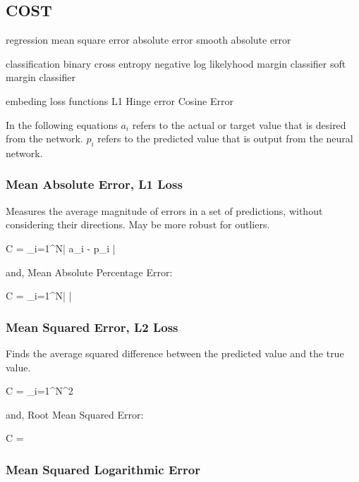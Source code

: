\documentclass{article}
\newcommand{\GPM}[1]{\left| {#1} \right|}
\newcommand{\SUMNP}[3]{\displaystyle\sum_{#1}^{#2}\GPP{#3}}
\newcommand{\SUMNM}[3]{\displaystyle\sum_{#1}^{#2}\GPM{#3}}
\begin{document}
\subsection{COST}

regression
mean square error
absolute error
smooth absolute error

classification
binary cross entropy
negative log likelyhood
margin classifier
soft margin classifier

embeding loss functions
L1 Hinge error
Cosine Error


In the following equations
$a_i$ refers to the actual or target value that is desired from the network.
$p_i$ refers to the predicted value that is output from the neural network.

\subsubsection{Mean Absolute Error, L1 Loss}
Measures the average magnitude of errors in a set of predictions, without considering their directions. May be more robust for outliers.

\begin{tcequation}
  C =  \SUMNM{i=1}{N}{a_i - p_i}
\end{tcequation}

and, Mean Absolute Percentage Error:

\begin{tcequation}
  C =  \SUMNM{i=1}{N}{}
\end{tcequation}

\subsubsection{Mean Squared Error, L2 Loss}
Finds the average squared difference between the predicted value and the true value.

\begin{tcequation}
  C =  \SUMNP{i=1}{N}{a_i - p_i}^2
\end{tcequation}

and, Root Mean Squared Error:

\begin{tcequation}
  C = \sqrt{\frac{1}{N} \SUMNP{i=1}{N}{a_i - p_i}^2}
\end{tcequation}


\subsubsection{Mean Squared Logarithmic Error}
\end{document}
